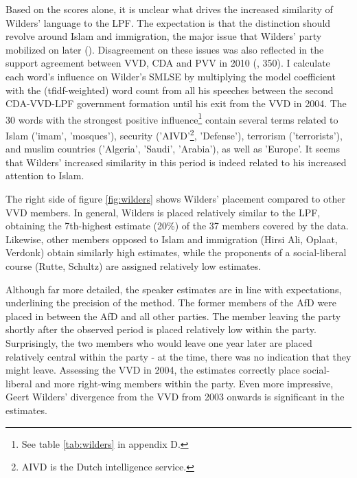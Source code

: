 \documentclass{article}
\begin{document}
Based on the scores alone, it is unclear what drives the increased similarity of Wilders' language to the LPF. The expectation is that the distinction should revolve around Islam and immigration, the major issue that Wilders' party mobilized on later (\cite{VanHolsteyn2011}). Disagreement on these issues was also reflected in the support agreement between VVD, CDA and PVV in 2010 (\cite{Otjes2014}, 350). I calculate each word's influence on Wilder's SMLSE  by multiplying the model coefficient with the (tfidf-weighted) word count from all his speeches between the second CDA-VVD-LPF government formation until his exit from the VVD in 2004. The 30 words with the strongest positive influence\footnote{See table \ref{tab:wilders} in appendix D.} contain several terms related to Islam ('imam', 'mosques'), security ('AIVD'\footnote{AIVD is the Dutch intelligence service.}, 'Defense'), terrorism ('terrorists'), and muslim countries ('Algeria', 'Saudi', 'Arabia'), as well as 'Europe'. It seems that Wilders' increased similarity in this period is indeed related to his increased attention to Islam.\par

The right side of figure \ref{fig:wilders} shows Wilders' placement compared to other VVD members. In general, Wilders is placed relatively similar to the LPF, obtaining the 7th-highest estimate (20\%) of the 37 members covered by the data. Likewise, other members opposed to Islam and immigration (Hirsi Ali, Oplaat, Verdonk) obtain similarly high estimates, while the proponents of a social-liberal course (Rutte, Schultz) are assigned relatively low estimates.\par

Although far more detailed, the speaker estimates are in line with expectations, underlining the precision of the method. The former members of the AfD were placed in between the AfD and all other parties. The member leaving the party shortly after the observed period is placed relatively low within the party. Surprisingly, the two members who would leave one year later are placed relatively central within the party - at the time, there was no indication that they might leave. Assessing the VVD in 2004, the estimates correctly place social-liberal and more right-wing members within the party. Even more impressive, Geert Wilders' divergence from the VVD from 2003 onwards is significant in the estimates.\par 
\end{document}
